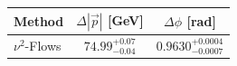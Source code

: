     \begin{tabular}{lcc}
        \toprule
        Method & $\Delta |\vec p|$ [GeV] & $\Delta \phi$ [rad] \\
        \midrule
        $\nu^2$-Flows & $74.99^{+0.07}_{-0.04}$ & $0.9630^{+0.0004}_{-0.0007}$ \\
        \bottomrule
    \end{tabular}